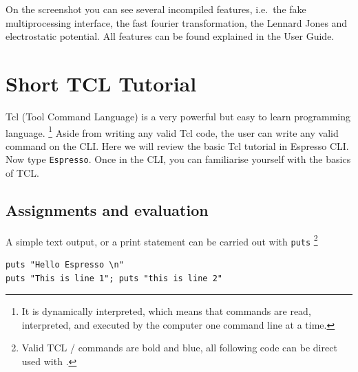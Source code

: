 \documentclass[
paper=a4,                       %
fontsize=11pt,                  %
twoside,                        %
footsepline,                    %
headsepline,                    %
headinclude=false,              %
footinclude=false,              %
pagesize,                       %
]{scrartcl}
\newtheorem{task}{Task}
\begin{document}
\vspace{1cm}\vspace{1cm}

On the screenshot you can see several incompiled features, i.e.~the fake multiprocessing interface, the fast fourier transformation, the Lennard Jones and electrostatic potential. All features can be found explained in the \es{} User Guide.

 \section{Short TCL Tutorial}\label{sec:tcl}

   Tcl (Tool Command Language) is a very powerful but easy to learn programming
   language. \footnote{It is dynamically interpreted, which means that commands are read,
   interpreted, and executed by the computer one command line at a time.} 
   Aside from writing any valid Tcl code, the user can write any valid \es{}
   command on the \es{} CLI. Here we will review the 
   basic Tcl tutorial \cite{tcl_tut_url} in Espresso CLI. Now type 
   \texttt{Espresso}. Once in the CLI, you can familiarise yourself with the 
   basics of TCL. 
   
    \subsection{Assignments and evaluation}
     A simple text output, or a print statement can be carried out with 
     \lstinline|puts| \footnote{Valid TCL / \es{} commands are bold and blue, all following code can be direct used with \es{}.}
      

{\vspace{0,2cm}\small
\begin{lstlisting}[numbers=none]
puts "Hello Espresso \n"
puts "This is line 1"; puts "this is line 2"
\end{lstlisting}\vspace{0,2cm}
}
\end{document}
